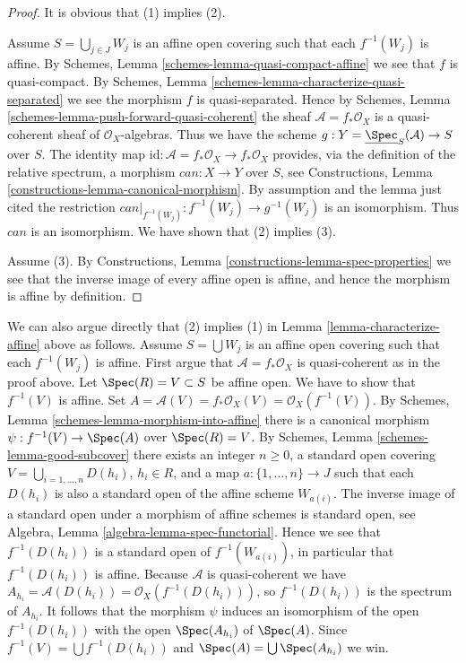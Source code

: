 \begin{proof}
It is obvious that (1) implies (2).

\medskip\noindent
Assume $S = \bigcup_{j \in J} W_j$ is an affine open covering such that
each $f^{-1}(W_j)$ is affine. By
Schemes, Lemma \ref{schemes-lemma-quasi-compact-affine} we see
that $f$ is quasi-compact. By
Schemes, Lemma \ref{schemes-lemma-characterize-quasi-separated}
we see the morphism $f$ is quasi-separated. Hence by
Schemes, Lemma \ref{schemes-lemma-push-forward-quasi-coherent} the
sheaf $\mathcal{A} = f_*\mathcal{O}_X$ is a quasi-coherent sheaf
of $\mathcal{O}_X$-algebras. Thus we have the scheme
$g : Y = \underline{\Spec}_S(\mathcal{A}) \to S$ over $S$.
The identity map
$\text{id} : \mathcal{A} = f_*\mathcal{O}_X \to f_*\mathcal{O}_X$
provides, via the definition of the relative spectrum,
a morphism $can : X \to Y$ over $S$, see
Constructions, Lemma \ref{constructions-lemma-canonical-morphism}.
By assumption and the lemma just cited
the restriction $can|_{f^{-1}(W_j)} : f^{-1}(W_j) \to g^{-1}(W_j)$
is an isomorphism. Thus $can$ is an isomorphism.
We have shown that (2) implies (3).

\medskip\noindent
Assume (3). By Constructions, Lemma \ref{constructions-lemma-spec-properties}
we see that the inverse image of every affine open is affine, and hence
the morphism is affine by definition.
\end{proof}

\begin{remark}
\label{remark-direct-argument}
We can also argue directly that (2) implies (1) in
Lemma \ref{lemma-characterize-affine} above as follows.
Assume $S = \bigcup W_j$ is an affine open covering
such that each $f^{-1}(W_j)$ is affine.
First argue that $\mathcal{A} = f_*\mathcal{O}_X$ is quasi-coherent
as in the proof above.
Let $\Spec(R) = V \subset S$ be affine open.
We have to show that $f^{-1}(V)$ is affine. Set
$A = \mathcal{A}(V) = f_*\mathcal{O}_X(V) = \mathcal{O}_X(f^{-1}(V))$.
By Schemes, Lemma \ref{schemes-lemma-morphism-into-affine} there is
a canonical morphism $\psi : f^{-1}(V) \to \Spec(A)$ over
$\Spec(R) = V$.
By Schemes, Lemma \ref{schemes-lemma-good-subcover} there exists
an integer $n \geq 0$, a standard open covering
$V = \bigcup_{i = 1, \ldots, n} D(h_i)$, $h_i \in R$, and a map
$a : \{1, \ldots, n\} \to J$ such that each $D(h_i)$ is also
a standard open of the affine scheme $W_{a(i)}$. The inverse image
of a standard open under a morphism of affine schemes is standard open, see
Algebra, Lemma \ref{algebra-lemma-spec-functorial}. Hence we see
that $f^{-1}(D(h_i))$ is a standard open of $f^{-1}(W_{a(i)})$,
in particular that $f^{-1}(D(h_i))$ is affine. Because $\mathcal{A}$
is quasi-coherent we have
$A_{h_i} = \mathcal{A}(D(h_i)) = \mathcal{O}_X(f^{-1}(D(h_i)))$,
so $f^{-1}(D(h_i))$ is the spectrum of $A_{h_i}$.
It follows that the morphism $\psi$ induces an isomorphism of the open
$f^{-1}(D(h_i))$ with the open $\Spec(A_{h_i})$ of
$\Spec(A)$. Since $f^{-1}(V) = \bigcup f^{-1}(D(h_i))$
and $\Spec(A) = \bigcup \Spec(A_{h_i})$ we win.
\end{remark}

